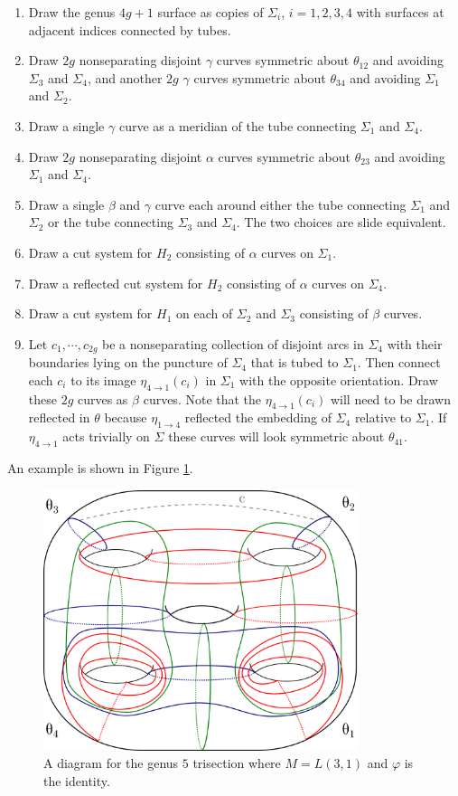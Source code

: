 \documentclass[12pt]{amsart}
\theoremstyle{definition}
\theoremstyle{remark}
\begin{document}
\begin{enumerate}
\item Draw the genus $4g+1$ surface as copies of $\Sigma_i$, $i = 1,2,3,4$ with surfaces at adjacent indices connected by tubes.
\item Draw $2g$ nonseparating disjoint $\gamma$ curves symmetric about $\theta_{12}$ and avoiding $\Sigma_3$ and $\Sigma_4$, and another $2g$ $\gamma$ curves symmetric about $\theta_{34}$ and avoiding $\Sigma_1$ and $\Sigma_2$.
\item Draw a single $\gamma$ curve as a meridian of the tube connecting $\Sigma_1$ and $\Sigma_4$.
\item Draw $2g$ nonseparating disjoint $\alpha$ curves symmetric about $\theta_{23}$ and avoiding $\Sigma_1$ and $\Sigma_4$.
\item Draw a single $\beta$ and $\gamma$ curve each around either the tube connecting $\Sigma_1$ and $\Sigma_2$ or the tube connecting $\Sigma_3$ and $\Sigma_4$.
The two choices are slide equivalent.
\item Draw a cut system for $H_2$ consisting of $\alpha$ curves on $\Sigma_1$.
\item Draw a reflected cut system for $H_2$ consisting of $\alpha$ curves on $\Sigma_4$.
\item Draw a cut system for $H_1$ on each of $\Sigma_2$ and $\Sigma_3$ consisting of $\beta$ curves.
\item Let $c_1,\cdots,c_{2g}$ be a nonseparating collection of disjoint arcs in $\Sigma_4$ with their boundaries lying on the puncture of $\Sigma_4$ that is tubed to $\Sigma_1$.
Then connect each $c_i$ to its image $\eta_{4 \to 1}(c_i)$ in $\Sigma_1$ with the opposite orientation.
Draw these $2g$ curves as $\beta$ curves.
Note that the $\eta_{4 \to 1}(c_i)$ will need to be drawn reflected in $\theta$ because $\eta_{1 \to 4}$ reflected the embedding of $\Sigma_4$ relative to $\Sigma_1$.
If $\eta_{4 \to 1}$ acts trivially on $\Sigma$ these curves will look symmetric about $\theta_{41}$.
\end{enumerate}

An example is shown in Figure \ref{unbalancedex}.



\begin{figure}[h]
\centering
\includegraphics[height=3in]{LxS12.png}
\caption{A diagram for the genus $5$ trisection where $M = L(3,1)$ and $\varphi$ is the identity.
}
\label{unbalancedex}
\end{figure}
\end{document}
